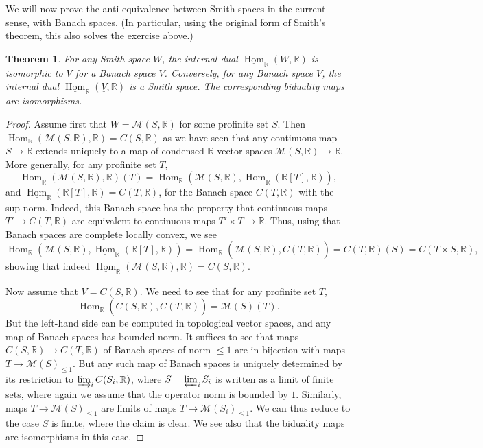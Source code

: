 \documentclass[11pt]{amsbook}
\DeclareMathOperator{\Hom}{Hom}
\newcommand{\intHom}{\underline{\Hom}}
\numberwithin{equation}{section}
\newtheorem{theorem}{Theorem}
\numberwithin{theorem}{section}
\theoremstyle{definition}
\begin{document}
We will now prove the anti-equivalence between Smith spaces in the current sense, with Banach spaces. (In particular, using the original form of Smith's theorem, this also solves the exercise above.)

\begin{theorem} For any Smith space $W$, the internal dual $\intHom_{\mathbb R}(W,\mathbb R)$ is isomorphic to $\underline{V}$ for a Banach space $V$. Conversely, for any Banach space $V$, the internal dual $\intHom_{\mathbb R}(\underline{V},\mathbb R)$ is a Smith space. The corresponding biduality maps are isomorphisms.
\end{theorem}

\begin{proof} Assume first that $W=\mathcal M(S,\mathbb R)$ for some profinite set $S$. Then $\Hom_{\mathbb R}(\mathcal M(S,\mathbb R),\mathbb R)=C(S,\mathbb R)$ as we have seen that any continuous map $S\to \mathbb R$ extends uniquely to a map of condensed $\mathbb R$-vector spaces $\mathcal M(S,\mathbb R)\to \mathbb R$. More generally, for any profinite set $T$,
\[
\intHom_{\mathbb R}(\mathcal M(S,\mathbb R),\mathbb R)(T) = \Hom_{\mathbb R}(\mathcal M(S,\mathbb R),\intHom_{\mathbb R}(\mathbb R[T],\mathbb R)),
\]
and $\intHom_{\mathbb R}(\mathbb R[T],\mathbb R)=\underline{C(T,\mathbb R)}$, for the Banach space $C(T,\mathbb R)$ with the sup-norm. Indeed, this Banach space has the property that continuous maps $T'\to C(T,\mathbb R)$ are equivalent to continuous maps $T'\times T\to \mathbb R$. Thus, using that Banach spaces are complete locally convex, we see
\[
\Hom_{\mathbb R}(\mathcal M(S,\mathbb R),\intHom_{\mathbb R}(\mathbb R[T],\mathbb R)) = \Hom_{\mathbb R}(\mathcal M(S,\mathbb R),\underline{C(T,\mathbb R)}) = C(T,\mathbb R)(S) = C(T\times S,\mathbb R),
\]
showing that indeed $\intHom_{\mathbb R}(\mathcal M(S,\mathbb R),\mathbb R)=\underline{C(S,\mathbb R)}$.

Now assume that $V=C(S,\mathbb R)$. We need to see that for any profinite set $T$,
\[
\Hom_{\mathbb R}(\underline{C(S,\mathbb R)},\underline{C(T,\mathbb R)}) = \mathcal M(S)(T).
\]
But the left-hand side can be computed in topological vector spaces, and any map of Banach spaces has bounded norm. It suffices to see that maps $C(S,\mathbb R)\to C(T,\mathbb R)$ of Banach spaces of norm $\leq 1$ are in bijection with maps $T\to \mathcal M(S)_{\leq 1}$. But any such map of Banach spaces is uniquely determined by its restriction to $\varinjlim_i C(S_i,\mathbb R)$, where $S=\varprojlim_i S_i$ is written as a limit of finite sets, where again we assume that the operator norm is bounded by $1$. Similarly, maps $T\to \mathcal M(S)_{\leq 1}$ are limits of maps $T\to \mathcal M(S_i)_{\leq 1}$. We can thus reduce to the case $S$ is finite, where the claim is clear. We see also that the biduality maps are isomorphisms in this case.


\end{proof}
\end{document}
